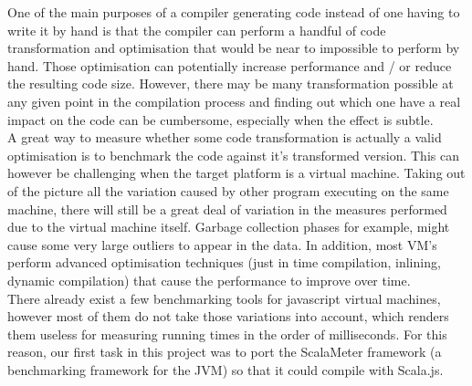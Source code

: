 One of the main purposes of a compiler generating code instead of one having to
write it by hand is that the compiler can perform a handful of code
transformation and optimisation that would be near to impossible to perform by
hand. Those optimisation can potentially increase performance and / or reduce
the resulting code size. However, there may be many transformation possible at
any given point in the compilation process and finding out which one have a
real impact on the code can be cumbersome, especially when the effect is
subtle.\\
A great way to measure whether some code transformation is actually a valid
optimisation is to benchmark the code against it's transformed version.
This can however be challenging when the target platform is a virtual machine.
Taking out of the picture all the variation caused by other program executing
on the same machine, there will still be a great deal of variation in the
measures performed due to the virtual machine itself. Garbage collection phases
for example, might cause some very large outliers to appear in the data. In
addition, most VM's perform advanced optimisation techniques (just in time
compilation, inlining, dynamic compilation) that cause the performance to
improve over time. \\
There already exist a few benchmarking tools for javascript virtual machines,
however most of them do not take those variations into account, which renders
them useless for measuring running times in the order of milliseconds. For this
reason, our first task in this project was to port the ScalaMeter framework (a
benchmarking framework for the JVM) so that it could compile with Scala.js.